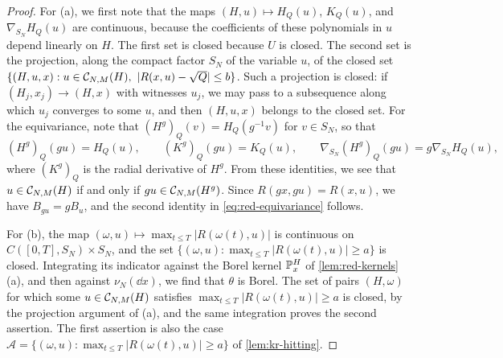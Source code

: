 \begin{proof}
For (a), we first note that the maps $(H,u)\mapsto H_Q(u)$, $K_Q(u)$, and $\nabla_{S_N}H_Q(u)$ are continuous, because the coefficients of these polynomials in $u$ depend linearly on $H$. The first set is closed because $U$ is closed. The second set is the projection, along the compact factor $S_N$ of the variable $u$, of the closed set $\{(H,u,x):u\in\mathcal C_{N,M}(H),\ |R(x,u)-\sqrt Q|\le b\}$. Such a projection is closed: if $(H_j,x_j)\to(H,x)$ with witnesses $u_j$, we may pass to a subsequence along which $u_j$ converges to some $u$, and then $(H,u,x)$ belongs to the closed set. For the equivariance, note that $(H^g)_Q(v)=H_Q(g^{-1}v)$ for $v\in S_N$, so that
\begin{equation*}
(H^g)_Q(gu)=H_Q(u),\qquad (K^g)_Q(gu)=K_Q(u),\qquad\nabla_{S_N}(H^g)_Q(gu)=g\nabla_{S_N}H_Q(u),
\end{equation*}
where $(K^g)_Q$ is the radial derivative of $H^g$. From these identities, we see that $u\in\mathcal C_{N,M}(H)$ if and only if $gu\in\mathcal C_{N,M}(H^g)$. Since $R(gx,gu)=R(x,u)$, we have $B_{gu}=gB_u$, and the second identity in \eqref{eq:red-equivariance} follows.

For (b), the map $(\omega,u)\mapsto\max_{t\le T}|R(\omega(t),u)|$ is continuous on $C([0,T],S_N)\times S_N$, and the set $\{(\omega,u):\max_{t\le T}|R(\omega(t),u)|\ge a\}$ is closed. Integrating its indicator against the Borel kernel $\mathbb P^H_x$ of \cref{lem:red-kernels}(a), and then against $\nu_N(\dd x)$, we find that $\theta$ is Borel. The set of pairs $(H,\omega)$ for which some $u\in\mathcal C_{N,M}(H)$ satisfies $\max_{t\le T}|R(\omega(t),u)|\ge a$ is closed, by the projection argument of (a), and the same integration proves the second assertion. The first assertion is also the case $\mathcal A=\{(\omega,u):\max_{t\le T}|R(\omega(t),u)|\ge a\}$ of \cref{lem:kr-hitting}.


\end{proof}

